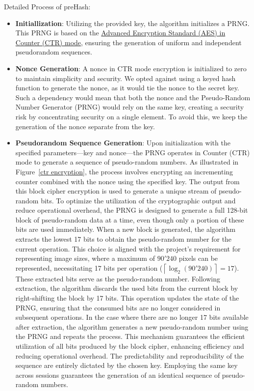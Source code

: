 Detailed Process of preHash:
\begin{itemize}
    \item \textbf{Initiallization}: Utilizing the provided key, the algorithm initializes a PRNG. This PRNG is based on the \hyperref[def:AES CTR mode]{Advanced Encryption Standard (AES) in Counter (CTR) mode}, ensuring the generation of uniform and independent pseudorandom sequences.

    \item \textbf{Nonce Generation}: A nonce in CTR mode encryption is initialized to zero to maintain simplicity and security. We opted against using a keyed hash function to generate the nonce, as it would tie the nonce to the secret key. Such a dependency would mean that both the nonce and the Pseudo-Random Number Generator (PRNG) would rely on the same key, creating a security risk by concentrating security on a single element. To avoid this, we keep the generation of the nonce separate from the key.

    \item \textbf{Pseudorandom Sequence Generation}: Upon initialization with the specified parameters—key and nonce—the PRNG operates in Counter (CTR) mode to generate a sequence of pseudo-random numbers. As illustrated in Figure~\ref{ctr encryption}, the process involves encrypting an incrementing counter combined with the nonce using the specified key. The output from this block cipher encryption is used to generate a unique stream of pseudo-random bits.
    To optimize the utilization of the cryptographic output and reduce operational overhead, the PRNG is designed to generate a full 128-bit block of pseudo-random data at a time, even though only a portion of these bits are used immediately. When a new block is generated, the algorithm extracts the lowest 17 bits to obtain the pseudo-random number for the current operation. This choice is aligned with the project's requirement for representing image sizes, where a maximum of \(90'240\) pixels can be represented, necessitating 17 bits per operation (\(\left\lceil \log_2(90'240) \right\rceil = 17\)). These extracted bits serve as the pseudo-random number.
    Following extraction, the algorithm discards the used bits from the current block by right-shifting the block by 17 bits. This operation updates the state of the PRNG, ensuring that the consumed bits are no longer considered in subsequent operations. In the case where there are no longer 17 bits available after extraction, the algorithm generates a new pseudo-random number using the PRNG and repeats the process. This mechanism guarantees the efficient utilization of all bits produced by the block cipher, enhancing efficiency and reducing operational overhead.
    The predictability and reproducibility of the sequence are entirely dictated by the chosen key. Employing the same key across sessions guarantees the generation of an identical sequence of pseudo-random numbers.
    

\end{itemize}
